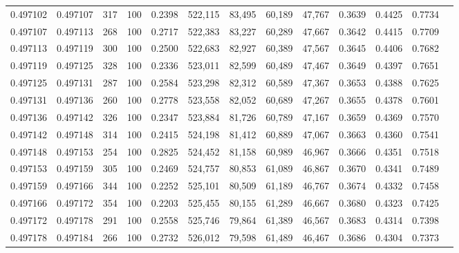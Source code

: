 \begin{tabular}{rrrrrrrrrrrrr}
0.497102 & 0.497107 &   317 & 100 &                                     0.2398 & 522,115 &  83,495 &  60,189 &  47,767 & 0.3639 & 0.4425 & 0.7734 \\
0.497107 & 0.497113 &   268 & 100 &                                     0.2717 & 522,383 &  83,227 &  60,289 &  47,667 & 0.3642 & 0.4415 & 0.7709 \\
0.497113 & 0.497119 &   300 & 100 &                                     0.2500 & 522,683 &  82,927 &  60,389 &  47,567 & 0.3645 & 0.4406 & 0.7682 \\
0.497119 & 0.497125 &   328 & 100 &                                     0.2336 & 523,011 &  82,599 &  60,489 &  47,467 & 0.3649 & 0.4397 & 0.7651 \\
0.497125 & 0.497131 &   287 & 100 &                                     0.2584 & 523,298 &  82,312 &  60,589 &  47,367 & 0.3653 & 0.4388 & 0.7625 \\
0.497131 & 0.497136 &   260 & 100 &                                     0.2778 & 523,558 &  82,052 &  60,689 &  47,267 & 0.3655 & 0.4378 & 0.7601 \\
0.497136 & 0.497142 &   326 & 100 &                                     0.2347 & 523,884 &  81,726 &  60,789 &  47,167 & 0.3659 & 0.4369 & 0.7570 \\
0.497142 & 0.497148 &   314 & 100 &                                     0.2415 & 524,198 &  81,412 &  60,889 &  47,067 & 0.3663 & 0.4360 & 0.7541 \\
0.497148 & 0.497153 &   254 & 100 &                                     0.2825 & 524,452 &  81,158 &  60,989 &  46,967 & 0.3666 & 0.4351 & 0.7518 \\
0.497153 & 0.497159 &   305 & 100 &                                     0.2469 & 524,757 &  80,853 &  61,089 &  46,867 & 0.3670 & 0.4341 & 0.7489 \\
0.497159 & 0.497166 &   344 & 100 &                                     0.2252 & 525,101 &  80,509 &  61,189 &  46,767 & 0.3674 & 0.4332 & 0.7458 \\
0.497166 & 0.497172 &   354 & 100 &                                     0.2203 & 525,455 &  80,155 &  61,289 &  46,667 & 0.3680 & 0.4323 & 0.7425 \\
0.497172 & 0.497178 &   291 & 100 &                                     0.2558 & 525,746 &  79,864 &  61,389 &  46,567 & 0.3683 & 0.4314 & 0.7398 \\
0.497178 & 0.497184 &   266 & 100 &                                     0.2732 & 526,012 &  79,598 &  61,489 &  46,467 & 0.3686 & 0.4304 & 0.7373 \\

\end{tabular}
